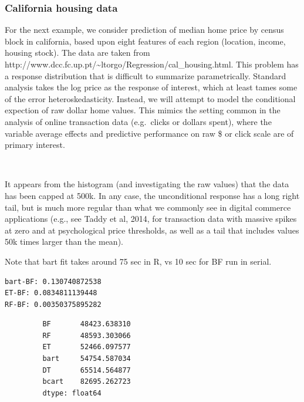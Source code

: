 \documentclass[12pt]{article}
\begin{document}
    \subsubsection{California housing data}\label{california-housing-data}

For the next example, we consider prediction of median home price by
census block in california, based upon eight features of each region
(location, income, housing stock). The data are taken from
http://www.dcc.fc.up.pt/\textasciitilde{}ltorgo/Regression/cal\_housing.html.
This problem has a response distribution that is difficult to summarize
parametrically. Standard analysis takes the log price as the response of
interest, which at least tames some of the error heteroskedasticity.
Instead, we will attempt to model the conditional expection of raw
dollar home values. This mimics the setting common in the analysis of
online transaction data (e.g.~clicks or dollars spent), where the
variable average effects and predictive performance on raw \$ or click
scale are of primary interest.


    \begin{center}
    \end{center}
    { \hspace*{\fill} \\}
    
    It appears from the histogram (and investigating the raw values) that
the data has been capped at 500k. In any case, the unconditional
response has a long right tail, but is much more regular than what we
commonly see in digital commerce applications (e.g., see Taddy et al,
2014, for transaction data with massive spikes at zero and at
psychological price thresholds, as well as a tail that includes values
50k times larger than the mean).


    Note that bart fit takes around 75 sec in R, vs 10 sec for BF run in
serial.


    \begin{verbatim}
bart-BF: 0.130740872538
ET-BF: 0.0834811139448
RF-BF: 0.00350375895282
    \end{verbatim}

            \begin{verbatim}
         BF       48423.638310
         RF       48593.303066
         ET       52466.097577
         bart     54754.587034
         DT       65514.564877
         bcart    82695.262723
         dtype: float64
\end{verbatim}
        
\end{document}
